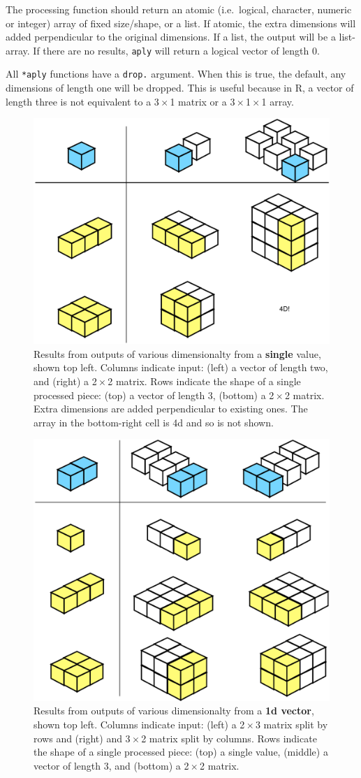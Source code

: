 \documentclass{scrartcl}
\newcommand{\code}[1]{\lstinline!#1!}
\newcommand{\x}{\,$\times$\,}
\begin{document}
The processing function should return an atomic (i.e.\ logical, character, numeric or integer) array of fixed size/shape, or a list.  If atomic, the extra dimensions will added perpendicular to the original dimensions.  If a list, the output will be a list-array. If there are no results, {\tt *aply} will return a logical vector of length 0.  

All \code{*aply} functions have a \code{drop.} argument.  When this is true, the default, any dimensions of length one will be dropped.  This is useful because in R, a vector of length three is not equivalent to a 3\x1 matrix or a 3\x1\x1 array.

\begin{figure}[htbp]
  \centering
  \includegraphics[width= 0.45 \textwidth]{output-a1}
  \caption{Results from outputs of various dimensionalty from a \textbf{single} value, shown top left.  Columns indicate input: (left) a vector of length two, and (right) a 2\x2 matrix.  Rows indicate the shape of a single processed piece: (top) a vector of length 3, (bottom) a 2\x2 matrix.  Extra dimensions are added perpendicular to existing ones.  The array in the bottom-right cell is 4d and so is not shown.}
  \label{fig:function-1d}
\end{figure}

\begin{figure}[htbp]
  \centering
  \includegraphics[width= 0.45 \textwidth]{output-a2}
  \caption{Results from outputs of various dimensionalty from a \textbf{1d vector}, shown top left.  Columns indicate input: (left) a 2\x3 matrix split by rows and (right) and 3\x2 matrix split by columns.  Rows indicate the shape of a single processed piece: (top) a single value, (middle) a vector of length 3, and (bottom) a 2\x2 matrix.}
  \label{fig:function-2d}
\end{figure}
\end{document}
